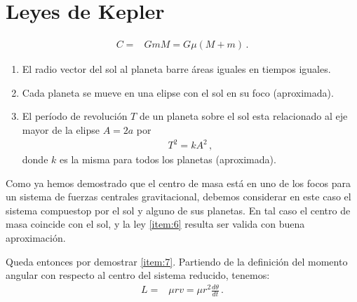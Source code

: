 
\section{Leyes de Kepler}

\begin{align}
    C=&GmM=G\mu(M+m)\,.
\end{align}


\begin{enumerate}
\item El radio vector del sol al planeta barre áreas iguales en tiempos iguales.
\item Cada planeta se mueve en una elipse con el sol en su foco (aproximada).
\label{item:6}
\item El período de revolución $T$ de un planeta sobre el sol esta relacionado al eje mayor de la elipse $A=2a$ por
  \begin{align}
    T^2=k A^2\,,
  \end{align}
donde $k$ es la misma para todos los planetas (aproximada).
\label{item:7}
\end{enumerate}

Como ya hemos demostrado que el centro de masa está en uno de los focos para un sistema de fuerzas centrales gravitacional, debemos considerar en este caso el sistema compuestop por el sol y alguno de sus planetas. En tal caso el centro de masa coincide con el sol, y la ley \ref{item:6} resulta ser valida con buena aproximación. 

Queda entonces por demostrar \ref{item:7}. Partiendo de la definición del momento angular con respecto al centro del sistema reducido, tenemos:
\begin{align}
  L=&\mu r v=\mu r^2 \frac{d\theta}{dt}\,.
\end{align}


